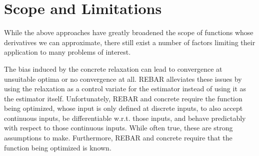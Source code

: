 \documentclass{article}
\begin{document}


\section{Scope and Limitations}
\label{limitations}
While the above approaches have greatly broadened the scope of functions whose derivatives we can approximate, there still exist a number of factors limiting their application to many problems of interest.

The bias induced by the concrete relaxation can lead to convergence at unsuitable optima or no convergence at all.
REBAR alleviates these issues by using the relaxation as a control variate for the estimator instead of using it as the estimator itself. Unfortunately, REBAR and concrete require the function being optimized, whose input is only defined at discrete inputs, to also accept continuous inputs, be differentiable w.r.t. those inputs, and behave predictably with respect to those continuous inputs.
While often true, these are strong assumptions to make. Furthermore, REBAR and concrete require that the function being optimized is known. 
\end{document}

